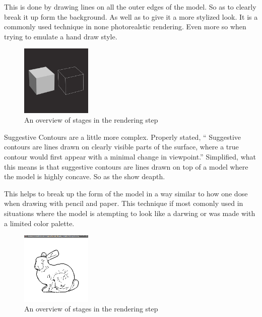 This is done by drawing lines on all the outer edges of the model. So as to clearly break it up form the background. As well as to give it a more stylized look. It is a commonly used technique in none photorealstic rendering. Even more so when trying to emulate a hand draw style.

\begin{figure}[h]
    \centering
    \includegraphics[width=0.3\textwidth]{img/Contour.jpg}
    \caption{An overview of stages in the rendering step}
    \label{fig-render-overview}
\end{figure}

Suggestive Contours are a little more complex. Properly stated, “ Suggestive contours are lines drawn on clearly visible parts of the surface, where a true contour would first appear with a minimal change in viewpoint.”  \cite{Contours} Simplified, what this means is that suggestive contours are lines drawn on top of a model where the model is highly concave. So as the show deapth.

This helps to break up the form of the model in a way similar to how one dose when drawing with pencil and paper. This technique if most comonly used in situations where the model is atempting to look like a darwing or was made with a limited color palette.

\begin{figure}[h]
    \centering
    \includegraphics[width=0.3\textwidth]{img/SuggestiveContours.png}
    \caption{An overview of stages in the rendering step}
    \label{fig-render-overview}
\end{figure}

